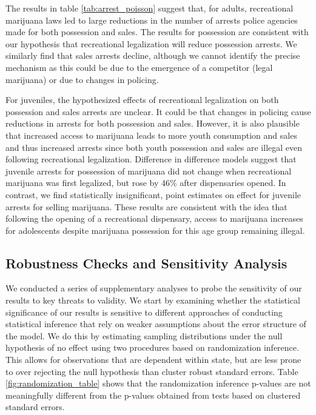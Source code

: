 \documentclass[12pt]{article}%
\begin{document}
The results in table \ref{tab:arrest_poisson} suggest that, for adults, recreational marijuana laws led to large reductions in the number of arrests police agencies made for both possession and sales. 
The results for possession are consistent with our hypothesis that recreational legalization will reduce possession arrests. 
We similarly find that sales arrests decline, although we cannot  identify the precise mechanism as this could be due to the emergence of a competitor (legal marijuana) or due to changes in policing. 

For juveniles, the hypothesized effects of recreational legalization on both possession and sales arrests are unclear. 
It could be that changes in policing cause reductions in arrests for both possession and sales. However, it is also plausible that increased access to marijuana leads to more youth consumption and sales and thus increased arrests since both youth possession and sales are illegal even following recreational legalization.  
Difference in difference models suggest that juvenile arrests for possession of marijuana did not change when recreational marijuana was first legalized, but rose by 46\% after dispensaries opened. 
In contrast, we find statistically insignificant, point estimates on effect for juvenile arrests for selling marijuana.
These results are consistent with the idea that following the opening of a recreational dispensary, access to marijuana increases for adolescents despite marijuana possession for this age group remaining illegal. 

\subsection{Robustness Checks and Sensitivity Analysis}

We conducted a series of supplementary analyses to probe the sensitivity of our results to key threats to validity. 
We start by examining whether the statistical significance of our results is sensitive to different approaches of conducting statistical inference that rely on weaker assumptions about the error structure of the model. 
We do this by estimating sampling distributions under the null hypothesis of no effect using two procedures based on randomization inference. 
This allows for observations that are dependent within state, but are less prone to over rejecting the null hypothesis than cluster robust standard errors. 
Table \ref{fig:randomization_table} shows that the randomization inference p-values are not meaningfully different from the p-values obtained from tests based on clustered standard errors. 
\end{document}
